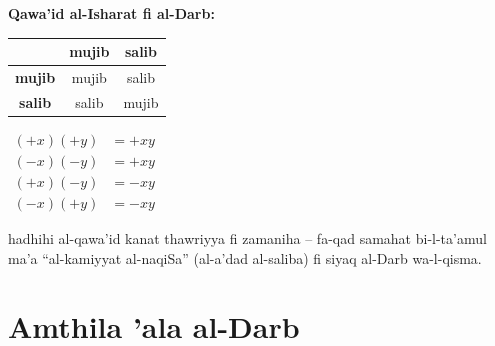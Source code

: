 \documentclass[11pt,a4paper]{book}
\begin{document}
\begin{mathexplain}
\textbf{Qawa'id al-Isharat fi al-Darb:}

\begin{center}
\begin{tabular}{|c|c|c|}
\hline
& \textbf{mujib} & \textbf{salib} \\
\hline
\textbf{mujib} & mujib & salib \\
\hline
\textbf{salib} & salib & mujib \\
\hline
\end{tabular}
\end{center}

\vspace{0.3cm}

$\begin{aligned}
  (+x)(+y) &= +xy \\
  (-x)(-y) &= +xy \\
  (+x)(-y) &= -xy \\
  (-x)(+y) &= -xy
\end{aligned}$

hadhihi al-qawa'id kanat thawriyya fi zamaniha -- fa-qad samahat
bi-l-ta'amul ma'a ``al-kamiyyat al-naqiSa'' (al-a'dad al-saliba)
fi siyaq al-Darb wa-l-qisma.
\end{mathexplain}

\section{Amthila 'ala al-Darb}
\end{document}
